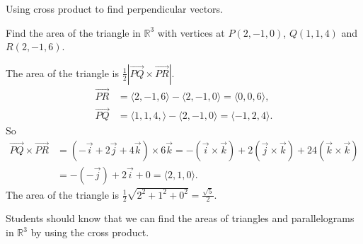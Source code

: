 \documentclass[noinstructornotes]{ximera}
\begin{document}
\begin{instructorNotes}
Using cross product to find perpendicular vectors. 
\end{instructorNotes}




\begin{problem}
Find the area of the triangle in $\mathbb{R}^3$ with vertices at $P(2, -1, 0)$, $Q(1, 1, 4)$ and $R(2, -1, 6)$. 
	\begin{freeResponse}
	The area of the triangle is $\frac{1}{2} | \vec{PQ} \times \vec{PR}|$. 
	\begin{align*}
	\vec{PR} &= \langle 2, -1, 6 \rangle - \langle 2, -1, 0 \rangle = \langle 0, 0, 6 \rangle, \\
	\vec{PQ} &= \langle 1, 1, 4, \rangle - \langle 2, -1, 0 \rangle = \langle -1, 2, 4 \rangle.
	\end{align*}
	So 
	\begin{align*}
	\vec{PQ} \times \vec{PR} &= (-\vec{i} +2\vec{j} +4\vec{k})\times 6\vec{k} = - (\vec{i}\times \vec{k}) +2 (\vec{j} \times \vec{k}) +24 (\vec{k}\times \vec{k}) \\ &= - (-\vec{j}) + 2 \vec{i} + 0 = \langle 2, 1, 0 \rangle.
	\end{align*}
	The area of the triangle is $\frac{1}{2} \sqrt{2^2+1^2+0^2} = \frac{\sqrt{5}}{2}$. 
	\end{freeResponse}
		
\end{problem}

\begin{instructorNotes}
Students should know that we can find the areas of triangles and parallelograms in $\mathbb{R}^3$ by using the cross product.
\end{instructorNotes}









	







								
				
				
	
\end{document}
